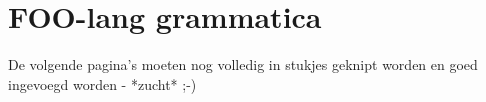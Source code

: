 \chapter{FOO-lang grammatica}
\label{foo-lang-grammar}

\TODO De volgende pagina's moeten nog volledig in stukjes geknipt worden en
goed ingevoegd worden - *zucht* ;-)


